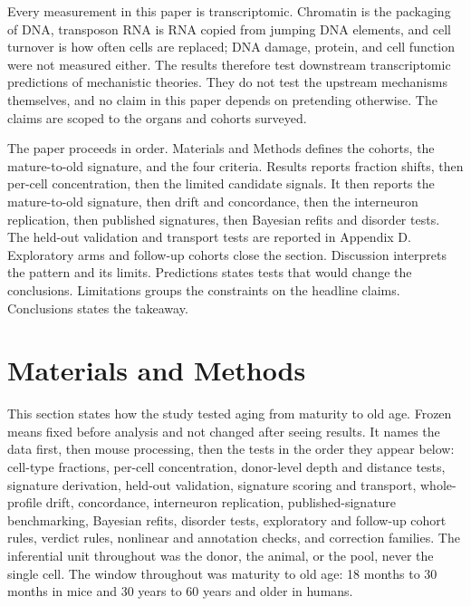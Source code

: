 \documentclass[11pt]{article}
\begin{document}
Every measurement in this paper is transcriptomic. Chromatin is the packaging of DNA, transposon RNA is RNA copied from jumping DNA elements, and cell turnover is how often cells are replaced; DNA damage, protein, and cell function were not measured either. The results therefore test downstream transcriptomic predictions of mechanistic theories. They do not test the upstream mechanisms themselves, and no claim in this paper depends on pretending otherwise. The claims are scoped to the organs and cohorts surveyed.


The paper proceeds in order. Materials and Methods defines the cohorts, the mature-to-old signature, and the four criteria. Results reports fraction shifts, then per-cell concentration, then the limited candidate signals. It then reports the mature-to-old signature, then drift and concordance, then the interneuron replication, then published signatures, then Bayesian refits and disorder tests. The held-out validation and transport tests are reported in Appendix D. Exploratory arms and follow-up cohorts close the section. Discussion interprets the pattern and its limits. Predictions states tests that would change the conclusions. Limitations groups the constraints on the headline claims. Conclusions states the takeaway.



\section*{Materials and Methods}

This section states how the study tested aging from maturity to old age. Frozen means fixed before analysis and not changed after seeing results. It names the data first, then mouse processing, then the tests in the order they appear below: cell-type fractions, per-cell concentration, donor-level depth and distance tests, signature derivation, held-out validation, signature scoring and transport, whole-profile drift, concordance, interneuron replication, published-signature benchmarking, Bayesian refits, disorder tests, exploratory and follow-up cohort rules, verdict rules, nonlinear and annotation checks, and correction families. The inferential unit throughout was the donor, the animal, or the pool, never the single cell. The window throughout was maturity to old age: 18 months to 30 months in mice and 30 years to 60 years and older in humans.
\end{document}
